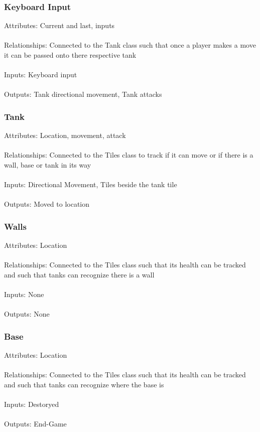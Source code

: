 \documentclass{article}
\begin{document}
\subsubsection{Keyboard Input}
Attributes: Current and last, inputs
\\\\Relationships: Connected to the Tank class such that once a player makes a 
move it can be passed onto there respective tank
\\\\Inputs: Keyboard input
\\\\Outputs: Tank directional movement, Tank attacks

\subsubsection{Tank}
Attributes: Location, movement, attack
\\\\Relationships: Connected to the Tiles class to track if it can move or if 
there is a wall, base or tank in its way
\\\\Inputs: Directional Movement, Tiles beside the tank tile
\\\\Outputs: Moved to location

\subsubsection{Walls}
Attributes: Location
\\\\Relationships: Connected to the Tiles class such that its health can be 
tracked and such that tanks can recognize there is a wall
\\\\Inputs: None
\\\\Outputs: None

\subsubsection{Base}
Attributes: Location
\\\\Relationships: Connected to the Tiles class such that its health can be 
tracked and such that tanks can recognize where the base is
\\\\Inputs: Destoryed
\\\\Outputs: End-Game
\end{document}

